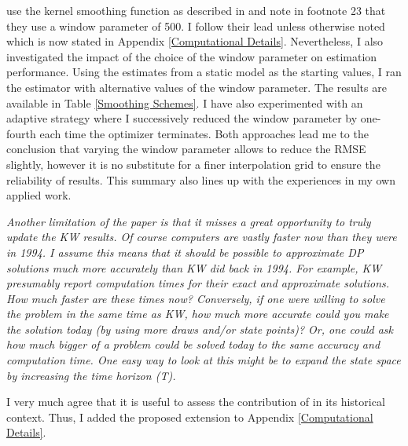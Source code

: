 \begin{boenumerate}
\cite{Keane.1994} use the kernel smoothing function as described in \citet{McFadden.1989} and note in footnote 23 that they use a window parameter of 500. I follow their lead unless otherwise noted which is now stated in Appendix \ref{Computational Details}. Nevertheless, I also investigated the impact of the choice of the window parameter on estimation performance. Using the estimates from a static model as the starting values, I ran the estimator with alternative values of the window parameter. The results are available in Table \ref{Smoothing Schemes}. I have also experimented with an adaptive strategy where I successively reduced the window parameter by one-fourth each time the optimizer terminates. Both approaches lead me to the conclusion that  varying the window parameter allows to reduce the RMSE slightly, however it is no substitute for a finer interpolation grid to ensure the reliability of results. This summary also lines up with the experiences in my own applied work.
\item \textit{Another limitation of the paper is that it misses a great opportunity to truly update the KW results. Of course computers are vastly faster now than they were in 1994. I assume this means that it should be possible to approximate DP solutions much more accurately than KW did back in 1994. For example, KW presumably report computation times for their exact and approximate solutions. How much faster are these times now? Conversely, if one were willing to solve the problem in the same time as KW, how much more accurate could you make the solution today (by using more draws and/or state points)? Or, one could ask how much bigger of a problem could be solved today to the same accuracy and computation time. One easy way to look at this might be to expand the state space by increasing the time horizon (T).}\vspace{0.5cm}

I very much agree that it is useful to assess the contribution of \citet{Keane.1994} in its historical context. Thus, I added the proposed extension to Appendix \ref{Computational Details}.
\end{boenumerate}
